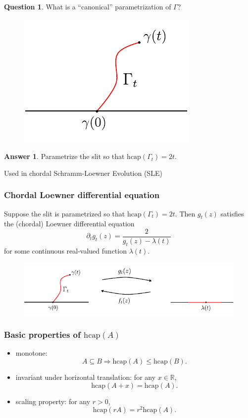 \documentclass[xcolor=pdftex,dvipsnames,table]{beamer}
\newcommand{\bbR}{\mathbb{R}}
\newcommand{\gl}{\lambda}
\newcommand{\gR}{\Gamma}
\newcommand{\hcap}{\text{hcap}}
\theoremstyle{definition}
\newtheorem{question}{Question}
\newtheorem{answer}{Answer}
\begin{document}
\begin{frame}
  \begin{question}
    What is a ``canonical'' parametrization of $\gR$?
  \end{question}
  \begin{figure}
    \includegraphics[scale=0.5]{chordalSlit_02.pdf}
  \end{figure}
  \begin{answer}
    Parametrize the slit so that $\hcap(\gR_t) = 2t$.
  \end{answer}
  \vspace{0.1in}
  Used in chordal Schramm-Loewner Evolution (SLE)
\end{frame}

\begin{frame}
  \frametitle{Chordal Loewner differential equation}
  \begin{theorem}
    Suppose the slit is parametrized so that {\color{Red!100} $\hcap(\gR_t) = 2t$}. Then $g_t(z)$
    satisfies the (chordal) Loewner differential equation
    {\color{black!30}
    \[
        \partial_t g_t(z) = \frac{2}{g_t(z) - \gl(t)}
    \]
    for some continuous real-valued function $\gl(t)$.}
  \end{theorem}
  \begin{figure}
    \includegraphics[scale=0.9]{chordal_f(z,t)_02.pdf}
  \end{figure}
\end{frame}

\begin{frame}
  \frametitle{Basic properties of $\hcap(A)$}
  \begin{itemize}
    \setlength{\itemsep}{0.3in}
    \item  monotone: \[A \subseteq B \Rightarrow \hcap(A) \leq \hcap(B).\]
    \item  invariant under horizontal translation: for any $x \in \bbR$, \[\hcap(A + x) = \hcap(A).\]
    \item  scaling property: for any $r > 0$, \[\hcap(r A) = r^2 \hcap(A).\]
  \end{itemize}
\end{frame}
\end{document}
